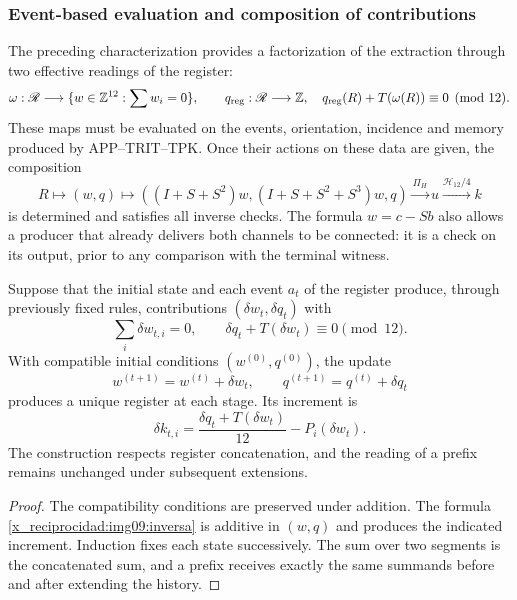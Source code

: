 \subsubsection{Event-based evaluation and composition of contributions}

The preceding characterization provides a factorization of the extraction through two effective readings of the register:
\begin{equation}
 \omega:\mathscr R\longrightarrow
 \{w\in\mathbb Z^{12}:\sum w_i=0\},\qquad
 q_{\rm reg}:\mathscr R\longrightarrow\mathbb Z,
 \quad q_{\rm reg}(R)+T(\omega(R))\equiv0\pmod {12}.
 \label{x_reciprocidad:img09:contrato-productor}
\end{equation}
These maps must be evaluated on the events, orientation, incidence and memory produced by APP--TRIT--TPK. Once their actions on these data are given, the composition
\[
 R\longmapsto(w,q)\longmapsto
 ((I+S+S^2)w,(I+S+S^2+S^3)w,q)
 \xrightarrow{\Pi_H}u\xrightarrow{\mathcal H_{12}/4}k
\]
is determined and satisfies all inverse checks. The formula $w=c-Sb$ also allows a producer that already delivers both channels to be connected: it is a check on its output, prior to any comparison with the terminal witness.

\begin{proposition}
\label{x_reciprocidad:img09:acumulacion}
Suppose that the initial state and each event $a_t$ of the register produce, through previously fixed rules, contributions $(\delta w_t,\delta q_t)$ with
\[
 \sum_i\delta w_{t,i}=0,\qquad
 \delta q_t+T(\delta w_t)\equiv0\pmod {12}.
\]
With compatible initial conditions $(w^{(0)},q^{(0)})$, the
update
\[
 w^{(t+1)}=w^{(t)}+\delta w_t,\qquad
 q^{(t+1)}=q^{(t)}+\delta q_t
\]
produces a unique register at each stage. Its increment is
\[
 \delta k_{t,i}=
 \frac{\delta q_t+T(\delta w_t)}{12}-P_i(\delta w_t).
\]
The construction respects register concatenation, and the reading of a prefix remains unchanged under subsequent extensions.
\end{proposition}
\begin{proof}
The compatibility conditions are preserved under addition. The formula \eqref{x_reciprocidad:img09:inversa} is additive in $(w,q)$ and produces the indicated increment. Induction fixes each state successively. The sum over two segments is the concatenated sum, and a prefix receives exactly the same summands before and after extending the history.
\end{proof}

